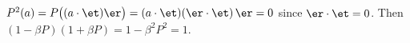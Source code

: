 $P^2(a) = P\bigl((a\cdot\et)\er\bigr) = (a\cdot\et)(\er\cdot\et)\,\er = 0$ since $\er \cdot \et = 0$. Then $(1 - \beta P)(1 + \beta P) = 1 - \beta^2 P^2 = 1$.
